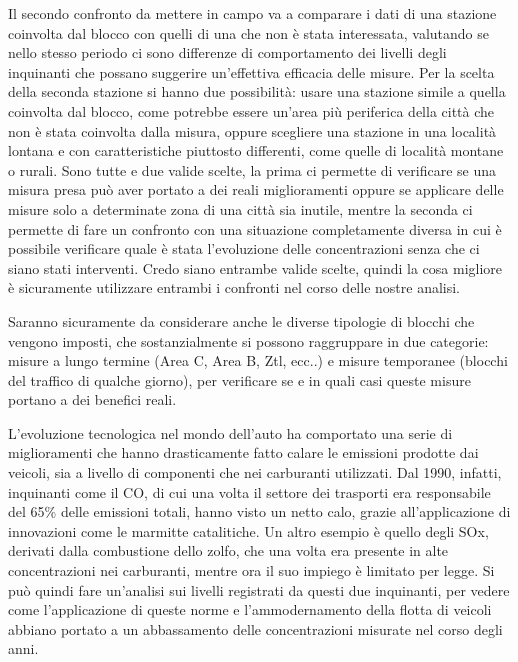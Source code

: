 \documentclass{article}
\begin{document}
Il secondo confronto da mettere in campo va a comparare i dati di una stazione coinvolta dal blocco con quelli di una che non è stata interessata, valutando se nello stesso periodo ci sono differenze di comportamento dei livelli degli inquinanti che possano suggerire un'effettiva efficacia delle misure.
Per la scelta della seconda stazione si hanno due possibilità: usare una stazione simile a quella coinvolta dal blocco, come potrebbe essere un'area più periferica della città che non è stata coinvolta dalla misura, oppure scegliere una stazione in una località lontana e con caratteristiche piuttosto differenti, come quelle di località montane o rurali. Sono tutte e due valide scelte, la prima ci permette di verificare se una misura presa può aver portato a dei reali miglioramenti oppure se applicare delle misure solo a determinate zona di una città sia inutile, mentre la seconda ci permette di fare un confronto con una situazione completamente diversa in cui è possibile verificare quale è stata l'evoluzione delle concentrazioni senza che ci siano stati interventi. Credo siano entrambe valide scelte, quindi la cosa migliore è sicuramente utilizzare entrambi i confronti nel corso delle nostre analisi.

Saranno sicuramente da considerare anche le diverse tipologie di blocchi che vengono imposti, che sostanzialmente si possono raggruppare in due categorie: misure a lungo termine (Area C, Area B, Ztl, ecc..) e misure temporanee (blocchi del traffico di qualche giorno), per verificare se e in quali casi queste misure portano a dei benefici reali. 

L'evoluzione tecnologica nel mondo dell'auto ha comportato una serie di miglioramenti che hanno drasticamente fatto calare le emissioni prodotte dai veicoli, sia a livello di componenti che nei carburanti utilizzati. Dal 1990, infatti, inquinanti come il CO, di cui una volta il settore dei trasporti era responsabile del 65\% delle emissioni totali, hanno visto un netto calo, grazie all'applicazione di innovazioni come le marmitte catalitiche. Un altro esempio è quello degli SOx, derivati dalla combustione dello zolfo, che una volta era presente in alte concentrazioni nei carburanti, mentre ora il suo impiego è limitato per legge. Si può quindi fare un'analisi sui livelli registrati da questi due inquinanti, per vedere come l'applicazione di queste norme e l'ammodernamento della flotta di veicoli abbiano portato a un abbassamento delle concentrazioni misurate nel corso degli anni.
\end{document}

